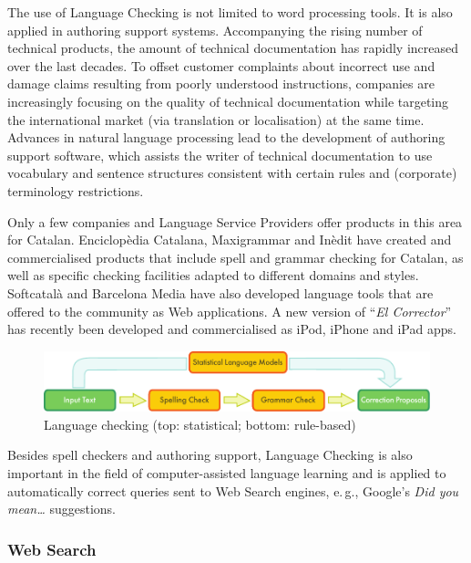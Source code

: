 \begin{multicols}{2}
The use of Language Checking is not limited to word processing tools. It is also applied in authoring support systems. Accompanying the rising number of technical products, the amount of technical documentation has rapidly increased over the last decades. To offset customer complaints about incorrect use and damage claims resulting from poorly understood instructions, companies are increasingly focusing on the quality of technical documentation while targeting the international market (via translation or localisation) at the same time. Advances in natural language processing lead to the development of authoring support software, which assists the writer of technical documentation to use vocabulary and sentence structures consistent with certain rules and (corporate) terminology restrictions.


Only a few companies and Language Service Providers offer products in this area for Catalan. Enciclopèdia Catalana, Maxigrammar and Inèdit have created and commercialised products that include spell and grammar checking for Catalan, as well as specific checking facilities adapted to different domains and styles. Softcatalà and Barcelona Media have also developed language tools that are offered to the community as Web applications. A new version of ``\textit{El Corrector}” has recently been developed and commercialised as iPod, iPhone and iPad apps. 

\begin{figure}[htb]
  \center
  \includegraphics[width=\textwidth]{../_media/english/language_checking}
  \caption{Language checking (top: statistical; bottom: rule-based)}
  \label{fig:langcheckingaarch_en}
\end{figure}

Besides spell checkers and authoring support, Language Checking is also important in the field of computer-assisted language learning and is applied to automatically correct queries sent to Web Search engines, e.\,g., Google’s \textit{Did you mean…} suggestions. 

\subsubsection{Web Search}


\end{multicols}
